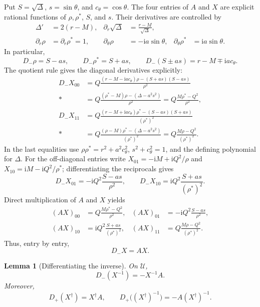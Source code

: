 \documentclass[11pt,a4paper]{article}
\numberwithin{equation}{section}
\newtheorem{lemma}[theorem]{Lemma}
\theoremstyle{definition}
\theoremstyle{remark}
\newcommand{\I}{\mathrm i}
\newcommand{\Uext}{\mathcal U}
\begin{document}
Put \(S=\sqrt\Delta\), \(s=\sin\theta\), and \(c_\theta=\cos\theta\).
The four entries of \(A\) and \(X\) are explicit rational functions of
\(\rho,\rho^*\), \(S\), and \(s\).  Their derivatives are controlled by
\begin{align}
 \Delta'&=2(r-M),&
 \partial_r\sqrt\Delta&=\frac{r-M}{\sqrt\Delta},\label{eq:delta-derivs}\\
 \partial_r\rho&=\partial_r\rho^*=1,&
 \partial_\theta\rho&=-\I a\sin\theta,&
 \partial_\theta\rho^*&=\I a\sin\theta.\label{eq:rho-derivs}
\end{align}
In particular,
\[
 D_-\rho=S-as,\qquad D_-\rho^*=S+as,\qquad
 D_-(S\pm as)=r-M\mp\I a c_\theta.
\]
The quotient rule gives the diagonal derivatives explicitly:
\begin{align}
 D_-X_{00}
 &=Q\frac{(r-M-\I a c_\theta)\rho-(S+as)(S-as)}{\rho^2}\nonumber\\*
 &=Q\frac{(\rho^*-M)\rho-(\Delta-a^2s^2)}{\rho^2}
 =Q\frac{M\rho^*-Q^2}{\rho^2},\label{eq:X00deriv}\\
 D_-X_{11}
 &=Q\frac{(r-M+\I a c_\theta)\rho^*-(S-as)(S+as)}
 {(\rho^*)^2}\nonumber\\*
 &=Q\frac{(\rho-M)\rho^*-(\Delta-a^2s^2)}{(\rho^*)^2}
 =Q\frac{M\rho-Q^2}{(\rho^*)^2}.\label{eq:X11deriv}
\end{align}
In the last equalities use
\(\rho\rho^*=r^2+a^2c_\theta^2\),
\(s^2+c_\theta^2=1\), and the defining polynomial for \(\Delta\).
For the off-diagonal entries write
\(X_{01}=-\I M+\I Q^2/\rho\) and
\(X_{10}=\I M-\I Q^2/\rho^*\); differentiating the reciprocals gives
\begin{equation}
 D_-X_{01}=-\I Q^2\frac{S-as}{\rho^2},\qquad
 D_-X_{10}=\I Q^2\frac{S+as}{(\rho^*)^2}.
\label{eq:offdiagderiv}
\end{equation}
Direct multiplication of \(A\) and \(X\) yields
\begin{align}
 (AX)_{00}&=Q\frac{M\rho^*-Q^2}{\rho^2},&
 (AX)_{01}&=-\I Q^2\frac{S-as}{\rho^2},\nonumber\\
 (AX)_{10}&=\I Q^2\frac{S+as}{(\rho^*)^2},&
 (AX)_{11}&=Q\frac{M\rho-Q^2}{(\rho^*)^2}.
\label{eq:AXentries}
\end{align}
Thus, entry by entry,
\begin{equation}
 D_-X=AX.
\label{eq:DX}
\end{equation}

\begin{lemma}[Differentiating the inverse]
\label{lem:inverse}
On \(\Uext\),
\begin{equation}
 D_-(X^{-1})=-X^{-1}A.
\label{eq:DinvX}
\end{equation}
Moreover,
\begin{equation}
 D_+(X^\dagger)=X^\dagger A,\qquad
 D_+\bigl((X^\dagger)^{-1}\bigr)=-A(X^\dagger)^{-1}.
\label{eq:Dstar}
\end{equation}
\end{lemma}
\end{document}
